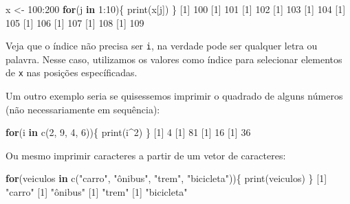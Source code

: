 \documentclass[
  10pt,
  a4paper]{book}
\newenvironment{Shaded}{\begin{snugshade}}{\end{snugshade}}
\newcommand{\ControlFlowTok}[1]{\textcolor[rgb]{0.13,0.29,0.53}{\textbf{#1}}}
\newcommand{\DecValTok}[1]{\textcolor[rgb]{0.00,0.00,0.81}{#1}}
\newcommand{\FunctionTok}[1]{\textcolor[rgb]{0.00,0.00,0.00}{#1}}
\newcommand{\NormalTok}[1]{#1}
\newcommand{\OtherTok}[1]{\textcolor[rgb]{0.56,0.35,0.01}{#1}}
\newcommand{\SpecialCharTok}[1]{\textcolor[rgb]{0.00,0.00,0.00}{#1}}
\newcommand{\StringTok}[1]{\textcolor[rgb]{0.31,0.60,0.02}{#1}}
\begin{document}
\begin{Shaded}
\begin{Highlighting}[]
\NormalTok{x }\OtherTok{\textless{}{-}} \DecValTok{100}\SpecialCharTok{:}\DecValTok{200}
\ControlFlowTok{for}\NormalTok{(j }\ControlFlowTok{in} \DecValTok{1}\SpecialCharTok{:}\DecValTok{10}\NormalTok{)\{}
    \FunctionTok{print}\NormalTok{(x[j])}
\NormalTok{\}}
\NormalTok{[}\DecValTok{1}\NormalTok{] }\DecValTok{100}
\NormalTok{[}\DecValTok{1}\NormalTok{] }\DecValTok{101}
\NormalTok{[}\DecValTok{1}\NormalTok{] }\DecValTok{102}
\NormalTok{[}\DecValTok{1}\NormalTok{] }\DecValTok{103}
\NormalTok{[}\DecValTok{1}\NormalTok{] }\DecValTok{104}
\NormalTok{[}\DecValTok{1}\NormalTok{] }\DecValTok{105}
\NormalTok{[}\DecValTok{1}\NormalTok{] }\DecValTok{106}
\NormalTok{[}\DecValTok{1}\NormalTok{] }\DecValTok{107}
\NormalTok{[}\DecValTok{1}\NormalTok{] }\DecValTok{108}
\NormalTok{[}\DecValTok{1}\NormalTok{] }\DecValTok{109}
\end{Highlighting}
\end{Shaded}

Veja que o índice não precisa ser \texttt{i}, na verdade pode ser qualquer
letra ou palavra. Nesse caso, utilizamos os valores como índice
para selecionar elementos de \texttt{x} nas posições específicadas.

Um outro exemplo seria se quisessemos imprimir o quadrado de alguns
números (não necessariamente em sequência):

\begin{Shaded}
\begin{Highlighting}[]
\ControlFlowTok{for}\NormalTok{(i }\ControlFlowTok{in} \FunctionTok{c}\NormalTok{(}\DecValTok{2}\NormalTok{, }\DecValTok{9}\NormalTok{, }\DecValTok{4}\NormalTok{, }\DecValTok{6}\NormalTok{))\{}
    \FunctionTok{print}\NormalTok{(i}\SpecialCharTok{\^{}}\DecValTok{2}\NormalTok{)}
\NormalTok{\}}
\NormalTok{[}\DecValTok{1}\NormalTok{] }\DecValTok{4}
\NormalTok{[}\DecValTok{1}\NormalTok{] }\DecValTok{81}
\NormalTok{[}\DecValTok{1}\NormalTok{] }\DecValTok{16}
\NormalTok{[}\DecValTok{1}\NormalTok{] }\DecValTok{36}
\end{Highlighting}
\end{Shaded}

Ou mesmo imprimir caracteres a partir de um vetor de caracteres:

\begin{Shaded}
\begin{Highlighting}[]
\ControlFlowTok{for}\NormalTok{(veiculos }\ControlFlowTok{in} \FunctionTok{c}\NormalTok{(}\StringTok{"carro"}\NormalTok{, }\StringTok{"ônibus"}\NormalTok{, }\StringTok{"trem"}\NormalTok{, }\StringTok{"bicicleta"}\NormalTok{))\{}
    \FunctionTok{print}\NormalTok{(veiculos)}
\NormalTok{\}}
\NormalTok{[}\DecValTok{1}\NormalTok{] }\StringTok{"carro"}
\NormalTok{[}\DecValTok{1}\NormalTok{] }\StringTok{"ônibus"}
\NormalTok{[}\DecValTok{1}\NormalTok{] }\StringTok{"trem"}
\NormalTok{[}\DecValTok{1}\NormalTok{] }\StringTok{"bicicleta"}
\end{Highlighting}
\end{Shaded}
\end{document}
